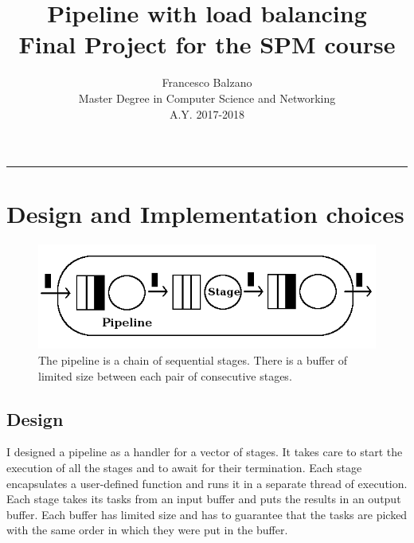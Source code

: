 \documentclass[12pt]{article}
\title{ \textbf {\vspace{0.1cm}\Huge Pipeline with load balancing\\ \vspace{0.3cm}}
 Final Project for the SPM course \vspace{0.5cm}\\}
\date{\vspace{1.0cm}}
\author{ \Large Francesco Balzano \vspace{0.3cm}\\ 
\Large Master Degree in Computer Science and Networking \vspace{0.4cm} \\
\Large A.Y. 2017-2018 
}
\begin{document}
  \maketitle
  \noindent\rule{18cm}{0.4pt}
  \tableofcontents
  \newpage

\clearpage
\setcounter{page}{2}
  
\section{Design and Implementation choices}

\begin{figure}
\centering
\includegraphics[scale=0.43]{Pipe}
\caption{The pipeline is a chain of sequential stages. There is a buffer of limited size between each pair of consecutive stages.}
\label{fig:pipe}
\end{figure}  

\subsection{Design} 
I designed a pipeline as a handler for a vector of stages. It takes care to start the execution of all the stages and to await for their termination. Each stage encapsulates a user-defined function and runs it in a separate thread of execution. Each stage takes its tasks from an input buffer and puts the results in an output buffer. Each buffer has limited size and has to guarantee that the tasks are picked with the same order in which they were put in the buffer.
\end{document}
